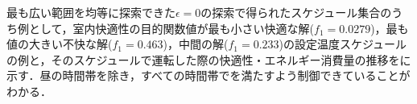 最も広い範囲を均等に探索できた$\epsilon=0$の探索で得られたスケジュール集合のうち例として，室内快適性の目的関数値が最も小さい快適な解($f_1=0.0279$)，最も値の大きい不快な解($f_1=0.463$)，中間の解($f_1=0.233$)の設定温度スケジュールの例と，そのスケジュールで運転した際の快適性・エネルギー消費量の推移をに示す．昼の時間帯を除き，すべての時間帯でを満たすよう制御できていることがわかる．

